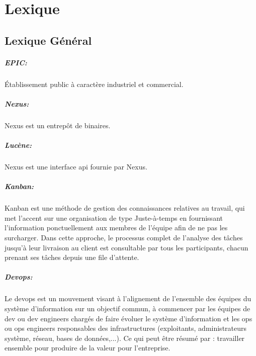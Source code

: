 \chapter{Lexique}

\section{Lexique Général}

\paragraph{EPIC: }
\label{lexi:epic}
Établissement public à caractère industriel et commercial.

\paragraph{Nexus: }
\label{lexi:nexus}
Nexus est un entrepôt de binaires.

\paragraph{Lucène: }
\label{lexi:lucene}
Nexus est une interface api fournie par Nexus.

\paragraph{Kanban: }
\label{lexi:kanban}
Kanban est une méthode de gestion des connaissances relatives au travail,
qui met l’accent sur une organisation de type Juste-à-temps en fournissant l'information ponctuellement aux membres de l'équipe afin de ne pas les surcharger.
Dans cette approche, le processus complet de l'analyse des tâches jusqu’à leur livraison au client est consultable par tous les participants,
chacun prenant ses tâches depuis une file d'attente.

\paragraph{Devops: }
\label{lexi:devops}
Le devops est un mouvement visant à l'alignement de l'ensemble des équipes du système d'information sur un objectif commun,
à commencer par les équipes de dev ou dev engineers chargés de faire évoluer le système d'information et les ops ou ops engineers responsables des infrastructures (exploitants, administrateurs système, réseau, bases de données,...).
Ce qui peut être résumé par : travailler ensemble pour produire de la valeur pour l'entreprise.

